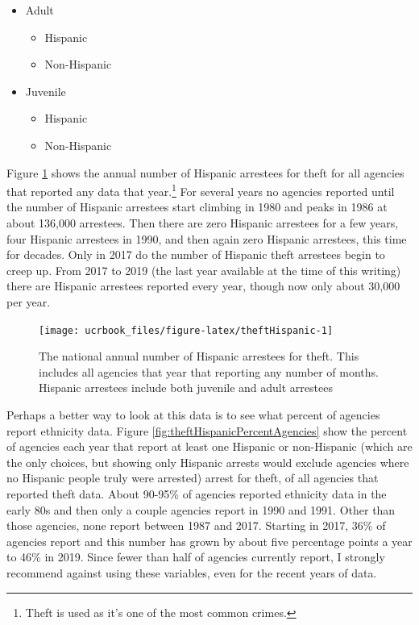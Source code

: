 \documentclass[
  12pt,
  openany]{book}
\providecommand{\tightlist}{%
  \setlength{\itemsep}{0pt}\setlength{\parskip}{0pt}}
\begin{document}
\begin{itemize}
\tightlist
\item
  Adult

  \begin{itemize}
  \tightlist
  \item
    Hispanic
  \item
    Non-Hispanic
  \end{itemize}
\item
  Juvenile

  \begin{itemize}
  \tightlist
  \item
    Hispanic
  \item
    Non-Hispanic
  \end{itemize}
\end{itemize}

Figure \ref{fig:theftHispanic} shows the annual number of Hispanic arrestees for theft for all agencies that reported any data that year.\footnote{Theft is used as it's one of the most common crimes.} For several years no agencies reported until the number of Hispanic arrestees start climbing in 1980 and peaks in 1986 at about 136,000 arrestees. Then there are zero Hispanic arrestees for a few years, four Hispanic arrestees in 1990, and then again zero Hispanic arrestees, this time for decades. Only in 2017 do the number of Hispanic theft arrestees begin to creep up. From 2017 to 2019 (the last year available at the time of this writing) there are Hispanic arrestees reported every year, though now only about 30,000 per year.

\begin{figure}

{\centering \texttt{[image: ucrbook\_files/figure-latex/theftHispanic-1]} 

}

\caption{The national annual number of Hispanic arrestees for theft. This includes all agencies that year that reporting any number of months. Hispanic arrestees include both juvenile and adult arrestees}\label{fig:theftHispanic}
\end{figure}

Perhaps a better way to look at this data is to see what percent of agencies report ethnicity data. Figure \ref{fig:theftHispanicPercentAgencies} show the percent of agencies each year that report at least one Hispanic or non-Hispanic (which are the only choices, but showing only Hispanic arrests would exclude agencies where no Hispanic people truly were arrested) arrest for theft, of all agencies that reported theft data. About 90-95\% of agencies reported ethnicity data in the early 80s and then only a couple agencies report in 1990 and 1991. Other than those agencies, none report between 1987 and 2017. Starting in 2017, 36\% of agencies report and this number has grown by about five percentage points a year to 46\% in 2019. Since fewer than half of agencies currently report, I strongly recommend against using these variables, even for the recent years of data.
\end{document}
